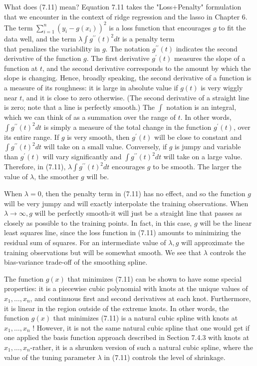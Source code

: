 \documentclass[10pt]{article}
\begin{document}
What does (7.11) mean? Equation 7.11 takes the "Loss+Penalty" formulation that we encounter in the context of ridge regression and the lasso in Chapter 6. The term $\sum_{i=1}^{n}\left(y_{i}-g\left(x_{i}\right)\right)^{2}$ is a loss function that encourages $g$ to fit the data well, and the term $\lambda \int g^{\prime \prime}(t)^{2} d t$ is a penalty term\\
that penalizes the variability in $g$. The notation $g^{\prime \prime}(t)$ indicates the second derivative of the function $g$. The first derivative $g^{\prime}(t)$ measures the slope of a function at $t$, and the second derivative corresponds to the amount by which the slope is changing. Hence, broadly speaking, the second derivative of a function is a measure of its roughness: it is large in absolute value if $g(t)$ is very wiggly near $t$, and it is close to zero otherwise. (The second derivative of a straight line is zero; note that a line is perfectly smooth.) The $\int$ notation is an integral, which we can think of as a summation over the range of $t$. In other words, $\int g^{\prime \prime}(t)^{2} d t$ is simply a measure of the total change in the function $g^{\prime}(t)$, over its entire range. If $g$ is very smooth, then $g^{\prime}(t)$ will be close to constant and $\int g^{\prime \prime}(t)^{2} d t$ will take on a small value. Conversely, if $g$ is jumpy and variable than $g^{\prime}(t)$ will vary significantly and $\int g^{\prime \prime}(t)^{2} d t$ will take on a large value. Therefore, in (7.11), $\lambda \int g^{\prime \prime}(t)^{2} d t$ encourages $g$ to be smooth. The larger the value of $\lambda$, the smoother $g$ will be.

When $\lambda=0$, then the penalty term in (7.11) has no effect, and so the function $g$ will be very jumpy and will exactly interpolate the training observations. When $\lambda \rightarrow \infty, g$ will be perfectly smooth-it will just be a straight line that passes as closely as possible to the training points. In fact, in this case, $g$ will be the linear least squares line, since the loss function in (7.11) amounts to minimizing the residual sum of squares. For an intermediate value of $\lambda, g$ will approximate the training observations but will be somewhat smooth. We see that $\lambda$ controls the bias-variance trade-off of the smoothing spline.

The function $g(x)$ that minimizes (7.11) can be shown to have some special properties: it is a piecewise cubic polynomial with knots at the unique values of $x_{1}, \ldots, x_{n}$, and continuous first and second derivatives at each knot. Furthermore, it is linear in the region outside of the extreme knots. In other words, the function $g(x)$ that minimizes (7.11) is a natural cubic spline with knots at $x_{1}, \ldots, x_{n}$ ! However, it is not the same natural cubic spline that one would get if one applied the basis function approach described in Section 7.4.3 with knots at $x_{1}, \ldots, x_{n}$-rather, it is a shrunken version of such a natural cubic spline, where the value of the tuning parameter $\lambda$ in (7.11) controls the level of shrinkage.
\end{document}
